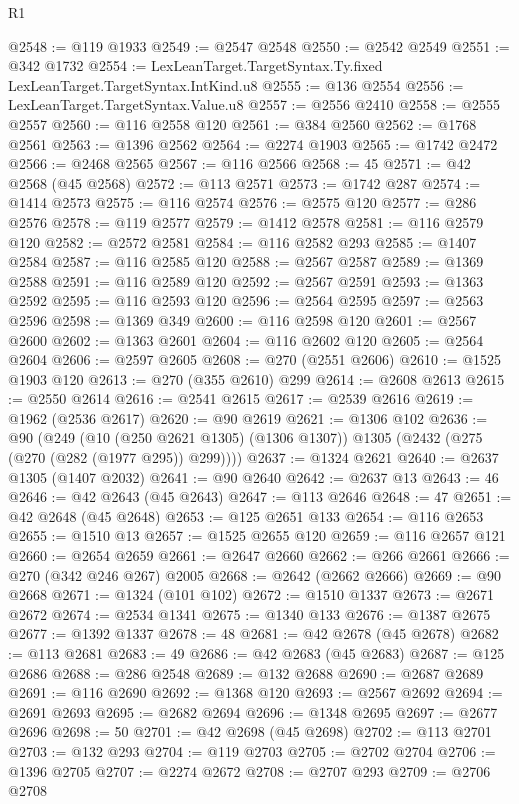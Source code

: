 \begin{lexlean}{R1}
\begin{coremodule}
@2548 := @119 @1933
@2549 := @2547 @2548
@2550 := @2542 @2549
@2551 := @342 @1732
@2554 := LexLeanTarget.TargetSyntax.Ty.fixed LexLeanTarget.TargetSyntax.IntKind.u8
@2555 := @136 @2554
@2556 := LexLeanTarget.TargetSyntax.Value.u8
@2557 := @2556 @2410
@2558 := @2555 @2557
@2560 := @116 @2558 @120
@2561 := @384 @2560
@2562 := @1768 @2561
@2563 := @1396 @2562
@2564 := @2274 @1903
@2565 := @1742 @2472
@2566 := @2468 @2565
@2567 := @116 @2566
@2568 := 45
@2571 := @42 @2568 (@45 @2568)
@2572 := @113 @2571
@2573 := @1742 @287
@2574 := @1414 @2573
@2575 := @116 @2574
@2576 := @2575 @120
@2577 := @286 @2576
@2578 := @119 @2577
@2579 := @1412 @2578
@2581 := @116 @2579 @120
@2582 := @2572 @2581
@2584 := @116 @2582 @293
@2585 := @1407 @2584
@2587 := @116 @2585 @120
@2588 := @2567 @2587
@2589 := @1369 @2588
@2591 := @116 @2589 @120
@2592 := @2567 @2591
@2593 := @1363 @2592
@2595 := @116 @2593 @120
@2596 := @2564 @2595
@2597 := @2563 @2596
@2598 := @1369 @349
@2600 := @116 @2598 @120
@2601 := @2567 @2600
@2602 := @1363 @2601
@2604 := @116 @2602 @120
@2605 := @2564 @2604
@2606 := @2597 @2605
@2608 := @270 (@2551 @2606)
@2610 := @1525 @1903 @120
@2613 := @270 (@355 @2610) @299
@2614 := @2608 @2613
@2615 := @2550 @2614
@2616 := @2541 @2615
@2617 := @2539 @2616
@2619 := @1962 (@2536 @2617)
@2620 := @90 @2619
@2621 := @1306 @102
@2636 := @90
    (@249
      (@10 (@250 @2621 @1305) (@1306 @1307))
      @1305
      (@2432 (@275 (@270 (@282 (@1977 @295)) @299))))
@2637 := @1324 @2621
@2640 := @2637 @1305 (@1407 @2032)
@2641 := @90 @2640
@2642 := @2637 @13
@2643 := 46
@2646 := @42 @2643 (@45 @2643)
@2647 := @113 @2646
@2648 := 47
@2651 := @42 @2648 (@45 @2648)
@2653 := @125 @2651 @133
@2654 := @116 @2653
@2655 := @1510 @13
@2657 := @1525 @2655 @120
@2659 := @116 @2657 @121
@2660 := @2654 @2659
@2661 := @2647 @2660
@2662 := @266 @2661
@2666 := @270 (@342 @246 @267) @2005
@2668 := @2642 (@2662 @2666)
@2669 := @90 @2668
@2671 := @1324 (@101 @102)
@2672 := @1510 @1337
@2673 := @2671 @2672
@2674 := @2534 @1341
@2675 := @1340 @133
@2676 := @1387 @2675
@2677 := @1392 @1337
@2678 := 48
@2681 := @42 @2678 (@45 @2678)
@2682 := @113 @2681
@2683 := 49
@2686 := @42 @2683 (@45 @2683)
@2687 := @125 @2686
@2688 := @286 @2548
@2689 := @132 @2688
@2690 := @2687 @2689
@2691 := @116 @2690
@2692 := @1368 @120
@2693 := @2567 @2692
@2694 := @2691 @2693
@2695 := @2682 @2694
@2696 := @1348 @2695
@2697 := @2677 @2696
@2698 := 50
@2701 := @42 @2698 (@45 @2698)
@2702 := @113 @2701
@2703 := @132 @293
@2704 := @119 @2703
@2705 := @2702 @2704
@2706 := @1396 @2705
@2707 := @2274 @2672
@2708 := @2707 @293
@2709 := @2706 @2708

\end{coremodule}
\end{lexlean}
